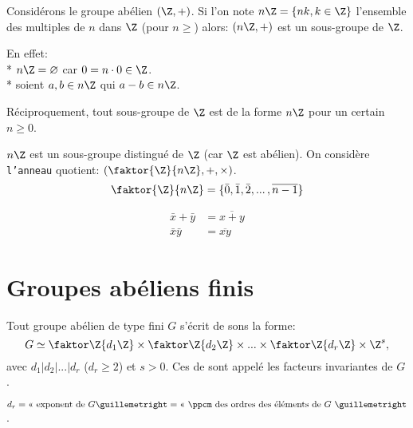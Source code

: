 Considérons le groupe abélien $(\Z, +)$. Si l'on note $n\Z=\{nk, k\in\Z\}$ l'ensemble des multiples de $n$ dans $\Z$ (pour $n\geq$) alors: $(n\Z,+)$ est un sous-groupe de $\Z$.

En effet: \\
* $n\Z=\varnothing$ car $0=n\cdot 0\in\Z$.\\
* soient $a,b\in n\Z$ qui $a-b\in n\Z$. 

Réciproquement, tout sous-groupe de $\Z$ est de la forme $n\Z$ pour un certain $n\geq 0$.

$n\Z$ est un sous-groupe distingué de $\Z$ (car $\Z$ est abélien). On considère \texttt{l'anneau} quotient: $(\faktor{\Z}{n\Z}, +, \times)$.
$$\faktor{\Z}{n\Z}=\{\bar 0,\bar 1, \bar 2, ...\,, \overline{n-1}\}$$

\begin{align*}
	\bar x+\bar y &= \overline{x+y}\\
	\bar x \bar y &= \overline{xy}
\end{align*}

\section{Groupes abéliens finis}

\begin{theorem}
	Tout groupe abélien de type fini $G$ s'écrit de sons la forme:
	$$G\simeq \faktor\Z{d_1\Z} \times \faktor\Z{d_2\Z} \times ... \times \faktor\Z{d_r\Z} \times \Z^s,$$
	avec $d_1|d_2|...|d_r$ ($d_r\geq 2$) et $s>0$. Ces de sont appelé les facteurs invariantes de $G$.
\end{theorem}
\begin{remark}
	$d_r = \text{« exponent de $G$} » = \text{« $\ppcm$ des ordres des éléments de $G$ »}$. 
\end{remark}

